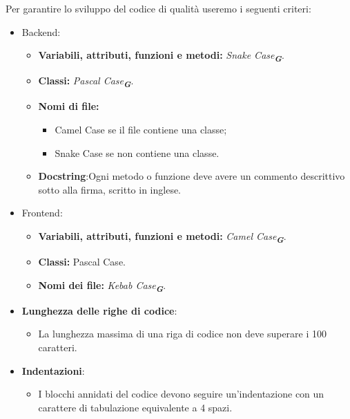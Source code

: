 Per garantire lo sviluppo del codice di qualità useremo i seguenti criteri:

\begin{itemize}
    \item Backend:
    \begin{itemize}
        \item \textbf{Variabili, attributi, funzioni e metodi:} \emph{Snake Case}\textsubscript{\textit{\textbf{G}}}.
        \item \textbf{Classi:} \emph{Pascal Case}\textsubscript{\textit{\textbf{G}}}.
        \item \textbf{Nomi di file:}
        \begin{itemize}
            \item Camel Case se il file contiene una classe;
            \item Snake Case se non contiene una classe.
        \end{itemize}
        \item \textbf{Docstring}:Ogni metodo o funzione deve avere un commento descrittivo sotto alla firma, scritto in inglese.
    \end{itemize}
    
    \item Frontend:
    \begin{itemize}
        \item \textbf{Variabili, attributi, funzioni e metodi:} \emph{Camel Case}\textsubscript{\textit{\textbf{G}}}.
        \item \textbf{Classi:} Pascal Case.
        \item \textbf{Nomi dei file:} \emph{Kebab Case}\textsubscript{\textit{\textbf{G}}}.
    \end{itemize}
    
    \item \textbf{Lunghezza delle righe di codice}:
    \begin{itemize}
        \item La lunghezza massima di una riga di codice non deve superare i 100 caratteri.
    \end{itemize}
    
    \item \textbf{Indentazioni}:
    \begin{itemize}
        \item I blocchi annidati del codice devono seguire un'indentazione con un carattere di tabulazione equivalente a 4 spazi.
    \end{itemize}
\end{itemize}

